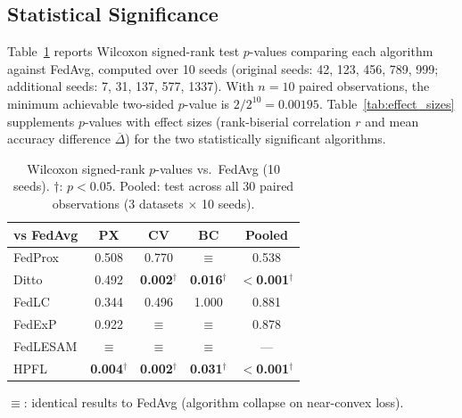 \documentclass[conference]{IEEEtran}
\begin{document}
\subsection{Statistical Significance}

Table~\ref{tab:significance} reports Wilcoxon signed-rank test $p$-values comparing each algorithm against FedAvg, computed over 10 seeds (original seeds: 42, 123, 456, 789, 999; additional seeds: 7, 31, 137, 577, 1337). With $n{=}10$ paired observations, the minimum achievable two-sided $p$-value is $2/2^{10} = 0.00195$. Table~\ref{tab:effect_sizes} supplements $p$-values with effect sizes (rank-biserial correlation $r$ and mean accuracy difference $\overline{\Delta}$) for the two statistically significant algorithms.

\begin{table}[t]
\centering
\caption{Wilcoxon signed-rank $p$-values vs.\ FedAvg (10 seeds). $\dagger$: $p < 0.05$. Pooled: test across all 30 paired observations (3 datasets $\times$ 10 seeds).}
\label{tab:significance}
\small
\begin{tabular}{lcccc}
\toprule
\textbf{vs FedAvg} & \textbf{PX} & \textbf{CV} & \textbf{BC} & \textbf{Pooled} \\
\midrule
FedProx & 0.508 & 0.770 & $\equiv$ & 0.538 \\
Ditto & 0.492 & \textbf{0.002}$^\dagger$ & \textbf{0.016}$^\dagger$ & \textbf{$<$0.001}$^\dagger$ \\
FedLC & 0.344 & 0.496 & 1.000 & 0.881 \\
FedExP & 0.922 & $\equiv$ & $\equiv$ & 0.878 \\
FedLESAM & $\equiv$ & $\equiv$ & $\equiv$ & --- \\
HPFL & \textbf{0.004}$^\dagger$ & \textbf{0.002}$^\dagger$ & \textbf{0.031}$^\dagger$ & \textbf{$<$0.001}$^\dagger$ \\
\bottomrule
\end{tabular}

\vspace{1mm}
\footnotesize{$\equiv$: identical results to FedAvg (algorithm collapse on near-convex loss).}
\end{table}
\end{document}
